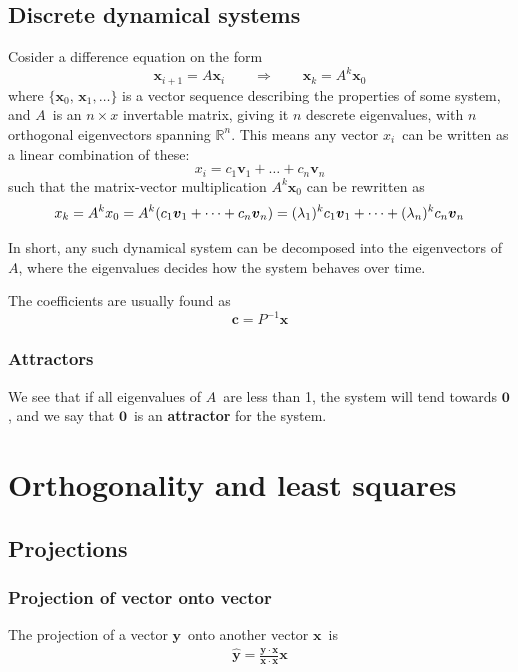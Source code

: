 \documentclass[12p,a4paper]{report}
\renewcommand{\b}{\boldsymbol}
\newcommand{\m}{\mathbb}
\begin{document}
\section{Discrete dynamical systems}
Cosider a difference equation on the form
\[
    \b x_{i+1} = A\b x_i \quad\quad \Rightarrow \quad\quad \b x_k = A^k \b x_0
\]
where $\{\b x_0,\,\b x_1,\dots\}$ is a vector sequence describing the properties of some system, and $A$ is an $n\times x$ invertable matrix, giving it $n$ descrete eigenvalues, with $n$ orthogonal eigenvectors spanning $\m R^n$. This means any vector $x_i$ can be written as a linear combination of these:
\[
    x_i = c_1 \b v_1 + \dots + c_n \b v_n
\]
such that the matrix-vector multiplication $A^k \b x_0$ can be rewritten as
\[
    x_k = A^k x_0 = A^k\qty(c_1 \b v_1 + \dots + c_n \b v_n) = (\lambda_1)^k c_1 \b v_1 + \dots + (\lambda_n)^k c_n \b v_n
\]

In short, any such dynamical system can be decomposed into the eigenvectors of $A$, where the eigenvalues decides how the system behaves over time.

The coefficients are usually found as
\[
    \b c = P^{-1}\b x
\]

\subsection{Attractors}
We see that if all eigenvalues of $A$ are less than 1, the system will tend towards $\b 0$, and we say that $\b 0$ is an \textbf{attractor} for the system.



\chapter{Orthogonality and least squares}
\section{Projections}
\subsection{Projection of vector onto vector}
The projection of a vector $\b y$ onto another vector $\b x$ is
\begin{align*}
    \hat{\b y} = \frac{\b y \cdot \b x}{\b x \cdot \b x}\b x
\end{align*}
\end{document}
